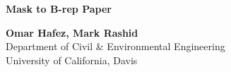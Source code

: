 \documentclass[12pt]{article}
\begin{document}

\vspace{7cm}
\begin{center}
   {\bf\Large Mask to B-rep Paper}
\end{center}

\vspace{1.5cm}
\begin{center} 
{\bf\large Omar Hafez, Mark Rashid}\\

{Department of Civil \& Environmental Engineering}\\
{University of California, Davis}\end{center}
















\end{document}
